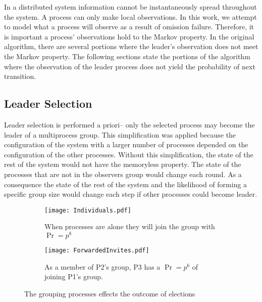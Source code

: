 In a distributed system information cannot be instantaneously spread throughout the system.
A process can only make local observations.
In this work, we attempt to model what a process will observe as a result of omission failure.
Therefore, it is important a process' observations hold to the Markov property.
In the original algorithm, there are several portions where the leader's observation does not meet the Markov property.
The following sections state the portions of the algorithm where the observation of the leader process does not yield the probability of next transition.

\subsection{Leader Selection}

Leader selection is performed a priori-- only the selected process may become the leader of a multiprocess group.
This simplification was applied because the configuration of the system with a larger number of processes depended on the configuration of the other processes.
Without this simplification, the state of the rest of the system would not have the memoryless property.
The state of the processes that are not in the observers group would change each round.
As a consequence the state of the rest of the system and the likelihood of forming a specific group size would change each step if other processes could become leader.

\begin{figure}
\begin{subfigure}{0.45\textwidth}
\texttt{[image: Individuals.pdf]}
\caption{When processes are alone they will join the group with $\Pr=p^8$} \label{fig:groupinga}
\end{subfigure}
\hspace*{\fill} %
\begin{subfigure}{0.45\textwidth}
\texttt{[image: ForwardedInvites.pdf]}
\caption{As a member of P2's group, P3 has a $\Pr=p^6$ of joining P1's group.} \label{fig:groupingb}
\end{subfigure}
\caption{The grouping processes effects the outcome of elections} \label{fig:grouping}
\end{figure}


